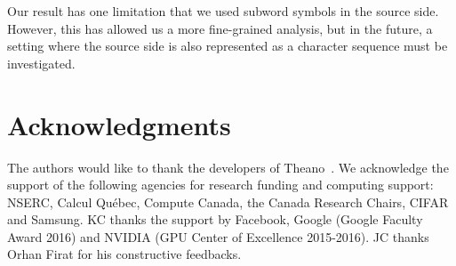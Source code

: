 \documentclass[11pt]{article}
\begin{document}
Our result has one limitation that we used subword symbols in the source side.
However, this has allowed us a more fine-grained analysis, but in the future, a
setting where the source side is also represented as a character sequence must
be investigated.

\section*{Acknowledgments}
\label{sec:ack}
The authors would like to thank the developers of Theano~\cite{team2016theano}.
We acknowledge the support of the following agencies for research funding and
computing support: NSERC, Calcul Qu\'{e}bec, Compute Canada,
the Canada Research Chairs, CIFAR and Samsung. KC thanks the support by
Facebook, Google (Google Faculty Award 2016) and NVIDIA (GPU Center of Excellence 2015-2016).
JC thanks Orhan Firat for his constructive feedbacks.



\end{document}
